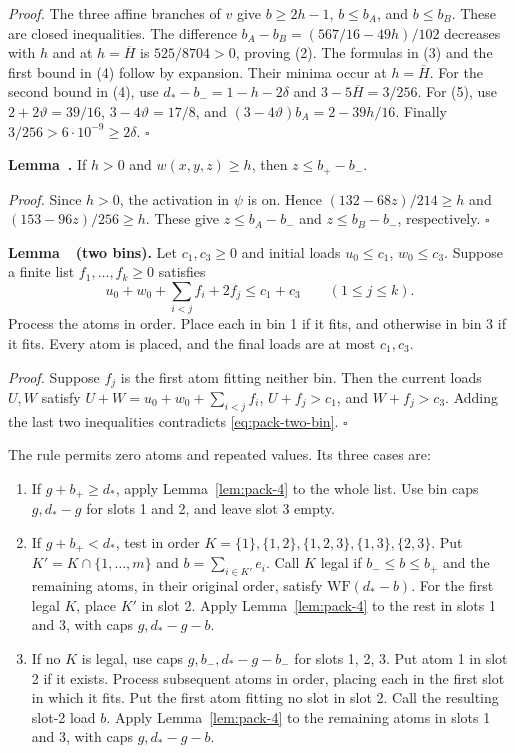 \emph{Proof.} The three affine branches of $v$ give
$b\ge2h-1$, $b\le b_A$, and $b\le b_B$.
These are closed inequalities. The difference
$b_A-b_B=(567/16-49h)/102$ decreases with $h$ and at
$h=\overline H$ is $525/8704>0$, proving (2). The formulas in
(3) and the first bound in (4) follow by expansion. Their minima occur
at $h=\overline H$. For the second bound in (4), use
$d_*-b_-=1-h-2\delta$ and $3-5\overline H=3/256$.
For (5), use $2+2\vartheta=39/16$,
$3-4\vartheta=17/8$, and
$(3-4\vartheta)b_A=2-39h/16$. Finally
$3/256>6\cdot10^{-9}\ge2\delta$. \hfill$\square$

\label{lem:pack-3}\textbf{Lemma~\thetheorem.} If $h>0$ and $w(x,y,z)\ge h$, then
$z\le b_+-b_-$.

\emph{Proof.} Since $h>0$, the activation in $\psi$ is on. Hence
$(132-68z)/214\ge h$ and $(153-96z)/256\ge h$. These give
$z\le b_A-b_-$ and $z\le b_B-b_-$, respectively. \hfill$\square$

\label{lem:pack-4}\textbf{Lemma~\thetheorem\ (two bins).} Let $c_1,c_3\ge0$ and initial loads
$u_0\le c_1$, $w_0\le c_3$. Suppose a finite list
$f_1,\ldots,f_k\ge0$ satisfies
\[
 u_0+w_0+\sum_{i<j}f_i+2f_j\le c_1+c_3\qquad(1\le j\le k).
 \tag{4.4}\label{eq:pack-two-bin}
\]
Process the atoms in order. Place each in bin 1 if it fits, and
otherwise in bin 3 if it fits. Every atom is placed, and the final loads
are at most $c_1,c_3$.

\emph{Proof.} Suppose $f_j$ is the first atom fitting neither bin.
Then the current loads $U,W$ satisfy
$U+W=u_0+w_0+\sum_{i<j}f_i$, $U+f_j>c_1$, and
$W+f_j>c_3$. Adding the last two inequalities contradicts
\eqref{eq:pack-two-bin}. \hfill$\square$

The rule permits zero atoms and repeated values. Its three cases are:
\begin{enumerate}
\item If $g+b_+\ge d_*$, apply Lemma~\ref{lem:pack-4} to the whole list.
      Use bin caps $g,d_*-g$ for slots 1 and 2, and leave slot 3 empty.
\item If $g+b_+<d_*$, test in order
      $K=\{1\},\{1,2\},\{1,2,3\},\{1,3\},\{2,3\}$. Put
      $K'=K\cap\{1,\ldots,m\}$ and $b=\sum_{i\in K'}e_i$.
      Call $K$ legal if $b_-\le b\le b_+$ and the remaining atoms,
      in their original order, satisfy $\mathrm{WF}(d_*-b)$. For
      the first legal $K$, place $K'$ in slot 2. Apply Lemma~\ref{lem:pack-4}
      to the rest in slots 1 and 3, with caps $g,d_*-g-b$.
\item If no $K$ is legal, use caps $g,b_-,d_*-g-b_-$ for slots
      1, 2, 3. Put atom 1 in slot 2 if it exists. Process subsequent
      atoms in order, placing each in the first slot in which it fits.
      Put the first atom fitting no slot in slot 2. Call the
      resulting slot-2 load $b$. Apply Lemma~\ref{lem:pack-4} to the remaining
      atoms in slots 1 and 3, with caps $g,d_*-g-b$.
\end{enumerate}

